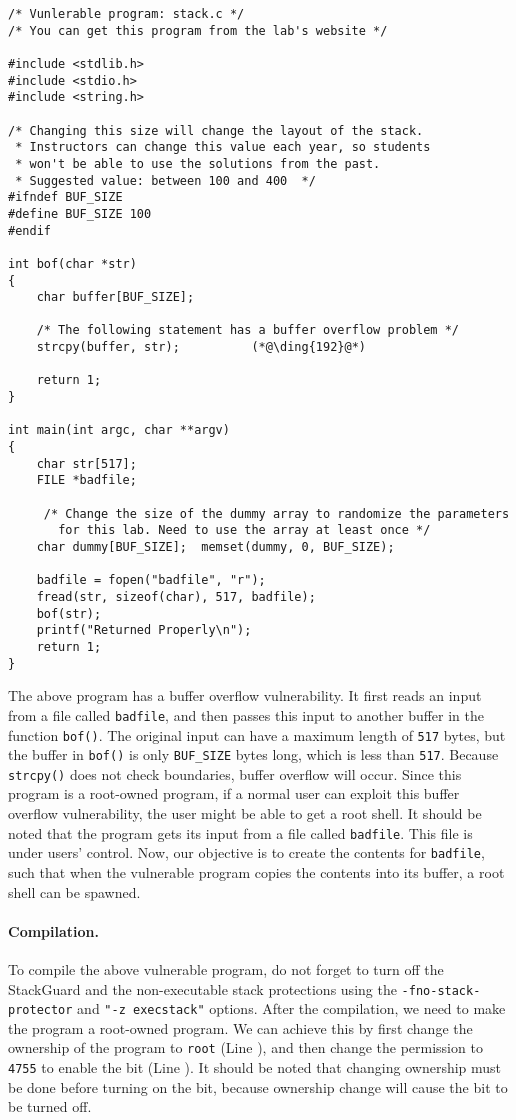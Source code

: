 \begin{lstlisting}
/* Vunlerable program: stack.c */
/* You can get this program from the lab's website */

#include <stdlib.h>
#include <stdio.h>
#include <string.h>

/* Changing this size will change the layout of the stack.
 * Instructors can change this value each year, so students
 * won't be able to use the solutions from the past.
 * Suggested value: between 100 and 400  */
#ifndef BUF_SIZE
#define BUF_SIZE 100
#endif

int bof(char *str)
{
    char buffer[BUF_SIZE];

    /* The following statement has a buffer overflow problem */ 
    strcpy(buffer, str);          (*@\ding{192}@*)

    return 1;
}

int main(int argc, char **argv)
{
    char str[517];
    FILE *badfile;

     /* Change the size of the dummy array to randomize the parameters
       for this lab. Need to use the array at least once */
    char dummy[BUF_SIZE];  memset(dummy, 0, BUF_SIZE); 

    badfile = fopen("badfile", "r");
    fread(str, sizeof(char), 517, badfile);
    bof(str);
    printf("Returned Properly\n");
    return 1;
}
\end{lstlisting}

The above program has a buffer overflow vulnerability. It first 
reads an input from a file called \texttt{badfile}, and then passes this
input to another buffer in the function {\tt bof()}. The 
original input can have a maximum length of \texttt{517} bytes, but the buffer
in {\tt bof()} is only \texttt{BUF\_SIZE} bytes long, which is less than
\texttt{517}. 
Because {\tt strcpy()} does not check
boundaries, buffer overflow will occur.
Since this program is a root-owned \setuid program, if a normal user can exploit
this buffer overflow vulnerability, the user might be 
able to get a root shell.
It should be noted that 
the program gets its input from a file called \texttt{badfile}. This file
is under users' control. Now, our objective is to 
create the contents for \texttt{badfile}, such that when the vulnerable program
copies the contents into its buffer, a root shell can be spawned.


\paragraph{Compilation.}
To compile the above vulnerable program, do not forget to 
turn off the StackGuard and the non-executable stack protections 
using the \texttt{-fno-stack-protector} and \texttt{"-z execstack"} options.
After the compilation, we need to make the program a
root-owned \setuid program. We can achieve this by first change the ownership of the program to
\texttt{root} (Line ), and then change the permission to \texttt{4755} to enable the
\setuid bit (Line ). It should be noted that changing ownership must be done before
turning on the \setuid bit, because ownership change will cause the \setuid bit to be turned
off.


